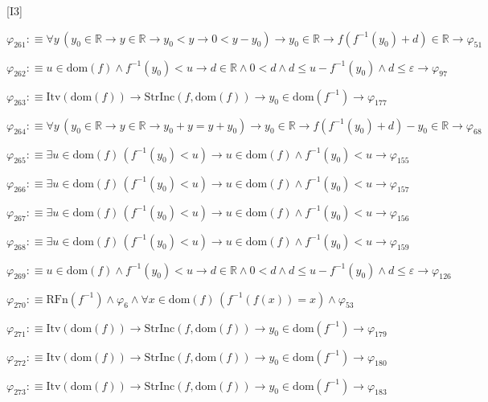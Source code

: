 \begin{fullproof}{[I3]}
\begin{abbrevlist}
\item $\varphi_{261} :\equiv \forall y\,(y_{0} \in \mathbb{R} \to y \in \mathbb{R} \to y_{0} < y \to 0 < y - y_{0}) \to y_{0} \in \mathbb{R} \to f(f^{-1}(y_{0}) + d) \in \mathbb{R} \to \varphi_{51}$
\item $\varphi_{262} :\equiv u \in \mathrm{dom}(f) \land f^{-1}(y_{0}) < u \to d \in \mathbb{R} \land 0 < d \land d \leq u - f^{-1}(y_{0}) \land d \leq \varepsilon \to \varphi_{97}$
\item $\varphi_{263} :\equiv \mathrm{Itv}(\mathrm{dom}(f)) \to \mathrm{StrInc}(f,\mathrm{dom}(f)) \to y_{0} \in \mathrm{dom}(f^{-1}) \to \varphi_{177}$
\item $\varphi_{264} :\equiv \forall y\,(y_{0} \in \mathbb{R} \to y \in \mathbb{R} \to y_{0} + y = y + y_{0}) \to y_{0} \in \mathbb{R} \to f(f^{-1}(y_{0}) + d) - y_{0} \in \mathbb{R} \to \varphi_{68}$
\item $\varphi_{265} :\equiv \exists u \in \mathrm{dom}(f)\,(f^{-1}(y_{0}) < u) \to u \in \mathrm{dom}(f) \land f^{-1}(y_{0}) < u \to \varphi_{155}$
\item $\varphi_{266} :\equiv \exists u \in \mathrm{dom}(f)\,(f^{-1}(y_{0}) < u) \to u \in \mathrm{dom}(f) \land f^{-1}(y_{0}) < u \to \varphi_{157}$
\item $\varphi_{267} :\equiv \exists u \in \mathrm{dom}(f)\,(f^{-1}(y_{0}) < u) \to u \in \mathrm{dom}(f) \land f^{-1}(y_{0}) < u \to \varphi_{156}$
\item $\varphi_{268} :\equiv \exists u \in \mathrm{dom}(f)\,(f^{-1}(y_{0}) < u) \to u \in \mathrm{dom}(f) \land f^{-1}(y_{0}) < u \to \varphi_{159}$
\item $\varphi_{269} :\equiv u \in \mathrm{dom}(f) \land f^{-1}(y_{0}) < u \to d \in \mathbb{R} \land 0 < d \land d \leq u - f^{-1}(y_{0}) \land d \leq \varepsilon \to \varphi_{126}$
\item $\varphi_{270} :\equiv \mathrm{RFn}(f^{-1}) \land \varphi_{6} \land \forall x \in \mathrm{dom}(f)\,(f^{-1}(f(x)) = x) \land \varphi_{53}$
\item $\varphi_{271} :\equiv \mathrm{Itv}(\mathrm{dom}(f)) \to \mathrm{StrInc}(f,\mathrm{dom}(f)) \to y_{0} \in \mathrm{dom}(f^{-1}) \to \varphi_{179}$
\item $\varphi_{272} :\equiv \mathrm{Itv}(\mathrm{dom}(f)) \to \mathrm{StrInc}(f,\mathrm{dom}(f)) \to y_{0} \in \mathrm{dom}(f^{-1}) \to \varphi_{180}$
\item $\varphi_{273} :\equiv \mathrm{Itv}(\mathrm{dom}(f)) \to \mathrm{StrInc}(f,\mathrm{dom}(f)) \to y_{0} \in \mathrm{dom}(f^{-1}) \to \varphi_{183}$

\end{abbrevlist}
\end{fullproof}
